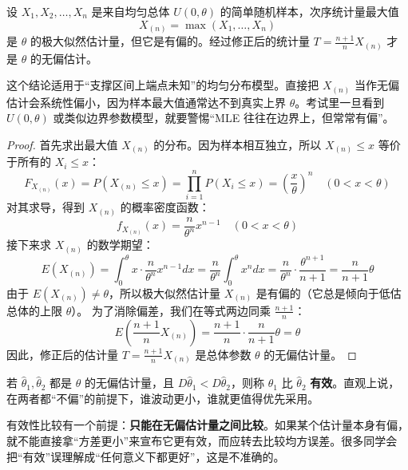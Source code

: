﻿\documentclass[lang=cn,11pt]{elegantbook}
\begin{document}
\begin{proposition}[均匀分布参数的无偏估计]\label{prop:uniform-unbiased}
    设 $X_1, X_2, \dots, X_n$ 是来自均匀总体 $U(0, \theta)$ 的简单随机样本，次序统计量最大值 \[X_{(n)} = \max(X_1, \dots, X_n)\]是 $\theta$ 的极大似然估计量，但它是有偏的。经过修正后的统计量 $T = \frac{n+1}{n}X_{(n)}$ 才是 $\theta$ 的无偏估计。
\end{proposition}
\begin{note}
这个结论适用于“支撑区间上端点未知”的均匀分布模型。直接把 \(X_{(n)}\) 当作无偏估计会系统性偏小，因为样本最大值通常达不到真实上界 \(\theta\)。考试里一旦看到 \(U(0,\theta)\) 或类似边界参数模型，就要警惕“MLE 往往在边界上，但常常有偏”。
\end{note}
\begin{proof}
    首先求出最大值 $X_{(n)}$ 的分布。因为样本相互独立，所以 $X_{(n)} \le x$ 等价于所有的 $X_i \le x$：$$F_{X_{(n)}}(x) = P(X_{(n)} \le x) = \prod_{i=1}^n P(X_i \le x) = \left(\frac{x}{\theta}\right)^n \quad (0 < x < \theta)$$对其求导，得到 $X_{(n)}$ 的概率密度函数：$$f_{X_{(n)}}(x) = \frac{n}{\theta^n}x^{n-1} \quad (0 < x < \theta)$$接下来求 $X_{(n)}$ 的数学期望：$$E(X_{(n)}) = \int_0^\theta x \cdot \frac{n}{\theta^n}x^{n-1} dx = \frac{n}{\theta^n} \int_0^\theta x^n dx = \frac{n}{\theta^n} \cdot \frac{\theta^{n+1}}{n+1} = \frac{n}{n+1}\theta$$由于 $E(X_{(n)}) \ne \theta$，所以极大似然估计量 $X_{(n)}$ 是有偏的（它总是倾向于低估总体的上限 $\theta$）。
    为了消除偏差，我们在等式两边同乘 $\frac{n+1}{n}$：$$E\left(\frac{n+1}{n}X_{(n)}\right) = \frac{n+1}{n} \cdot \frac{n}{n+1}\theta = \theta$$因此，修正后的估计量 $T = \frac{n+1}{n}X_{(n)}$ 是总体参数 $\theta$ 的无偏估计量。
\end{proof}


\begin{definition}[有效性] \label{def:efficiency}
若 \(\hat{\theta}_1, \hat{\theta}_2\) 都是 \(\theta\) 的无偏估计量，且 \(D\hat{\theta}_1 < D\hat{\theta}_2\)，则称 \(\hat{\theta}_1\) 比 \(\hat{\theta}_2\) \textbf{有效}。直观上说，在两者都“不偏”的前提下，谁波动更小，谁就更值得优先采用。
\end{definition}

\begin{note}
有效性比较有一个前提：\textbf{只能在无偏估计量之间比较}。如果某个估计量本身有偏，就不能直接拿“方差更小”来宣布它更有效，而应转去比较均方误差。很多同学会把“有效”误理解成“任何意义下都更好”，这是不准确的。
\end{note}
\end{document}
